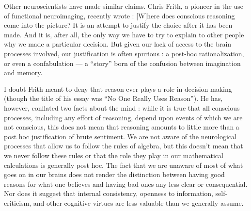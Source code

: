 \documentclass[a4paper,14pt]{extarticle}
\begin{document}
Other neuroscientists have made similar claims.
Chris Frith, a pioneer in the use of functional neuroimaging, recently wrote :
[W]here does conscious reasoning come into the picture?
It is an attempt to justify the choice after it has been made.
And it is, after all, the only way we have to try to explain to other people why we made a particular decision.
But given our lack of access to the brain processes involved, our justification is often spurious :
a post-hoc rationalization, or even a confabulation --- a ``story'' born of the confusion between imagination and memory.

I doubt Frith meant to deny that reason ever plays a role in decision making (though the title of his essay was ``No One Really Uses Reason'').
He has, however, conflated two facts about the mind :
while it is true that all conscious processes, including any effort of reasoning, depend upon events of which we are not conscious, this does not mean that reasoning amounts to little more than a post hoc justification of brute sentiment.
We are not aware of the neurological processes that allow us to follow the rules of algebra, but this doesn’t mean that we never follow these rules or that the role they play in our mathematical calculations is generally post hoc.
The fact that we are unaware of most of what goes on in our brains does not render the distinction between having good reasons for what one believes and having bad ones any less clear or consequential.
Nor does it suggest that internal consistency, openness to information, self-criticism, and other cognitive virtues are less valuable than we generally assume.
\end{document}
